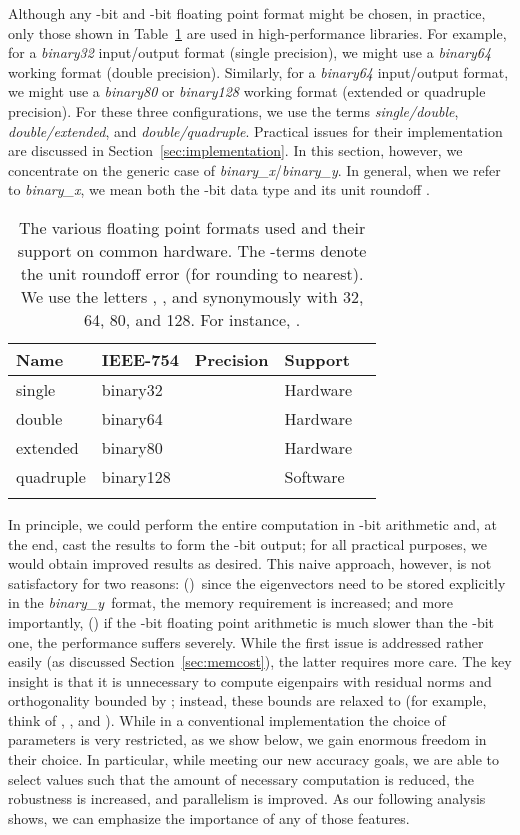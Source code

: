 \documentclass[final]{siamltex}
\newcommand{\binaryx}{{\it binary\_\hspace*{1pt}x}}
\newcommand{\binaryy}{{\it binary\_\hspace*{0pt}y}}
\begin{document}
Although any -bit and -bit floating point format might be chosen, in
practice, only those shown in
Table~\ref{tab:precisions} are used in high-performance libraries. 
For example, for a {\it binary32} input/output format (single precision), we
might use a {\it binary64} working format (double precision). Similarly, for
a {\it binary64} input/output format, we might use a {\it binary80} or {\it binary128} working
format (extended or quadruple precision). For these three configurations, we use the terms
{\it single/double}, {\it double/extended}, and {\it
  double/quadruple}. Practical issues for their implementation are  
discussed in Section~\ref{sec:implementation}. In this section, however, we
concentrate on the generic case of \binaryx/\binaryy. In general, when we
refer to \binaryx, we mean both the -bit data type and its unit roundoff . 
\begin{table}[htb]
  \begin{center}
\begin{tabular}[thb]{l@{\quad}l@{\quad}l@{\quad}l@{\quad}l@{\quad}}
\toprule
{\bf Name} & {\bf IEEE-754} & {\bf Precision} & {\bf Support}  \\
\midrule
single    & binary32   &  &  Hardware       \\ 
double    & binary64   &  &  Hardware       \\ 
extended  & binary80   &  &  Hardware       \\ 
quadruple & binary128  &  & Software       \\ 
\bottomrule\noalign{\smallskip}
\end{tabular}
  \end{center}
  \caption{The various floating point formats used and their support on common
    hardware. The -terms denote the unit roundoff error (for 
    rounding to nearest). We use the letters , ,  and
     synonymously with 32, 64, 80, and 128. For instance,
    .}
  \label{tab:precisions}
\end{table}

In principle, we could perform the entire computation in -bit arithmetic
and, at the end, cast the results to form the -bit output; for 
all practical purposes, we would obtain improved results as
desired. This naive approach, however, is not satisfactory for two reasons:
()~since the eigenvectors need to be
stored explicitly in the
\binaryy\ format, the memory requirement is increased; and more importantly,
() if the -bit floating point 
arithmetic is much slower than the -bit one, the
performance suffers severely. While the first issue is addressed rather
easily (as discussed Section~\ref{sec:memcost}), the latter requires more
care. The key insight is that it is unnecessary to compute eigenpairs with
residual norms and orthogonality bounded by ; instead,
these bounds are relaxed to  (for
example, think of , , and ). While in a conventional
implementation the choice of parameters is very restricted, as we show below, we gain enormous freedom in their choice. In
particular, while meeting our new accuracy goals, we are able to select values such
that the amount of necessary computation is reduced, the 
robustness is increased, and parallelism is improved. As our following analysis
shows, we can emphasize the importance of any of those features. 
\end{document}

